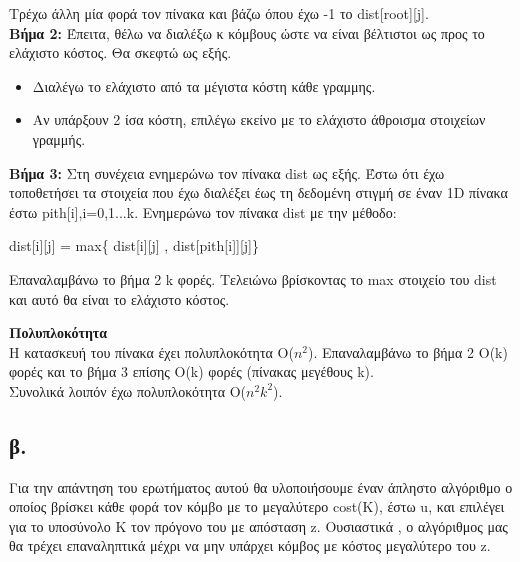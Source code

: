 \documentclass[12pt,a4paper]{article}
\begin{document}
Τρέχω άλλη μία φορά τον πίνακα και βάζω όπου έχω -1 το dist[root][j]. \\

\textbf{Βήμα 2:} Έπειτα, θέλω να διαλέξω κ κόμβους ώστε να είναι βέλτιστοι ως προς το ελάχιστο κόστος. Θα σκεφτώ ως εξής. 
\begin{itemize}
    \item Διαλέγω το ελάχιστο από τα μέγιστα κόστη κάθε γραμμης.
    \item Αν υπάρξουν 2 ίσα κόστη, επιλέγω εκείνο με το ελάχιστο άθροισμα στοιχείων γραμμής.
\end{itemize}

\textbf{Βήμα 3:} Στη συνέχεια ενημερώνω τον πίνακα dist ως εξής. Έστω ότι έχω τοποθετήσει τα στοιχεία που έχω διαλέξει έως τη δεδομένη στιγμή σε έναν 1D πίνακα έστω pith[i],i=0,1...k. Ενημερώνω τον πίνακα dist με την μέθοδο: \\
\begin{center}
    dist[i][j] = max\{ dist[i][j] , dist[pith[i]][j]\}
\end{center}

Επαναλαμβάνω το βήμα 2 k φορές. 
Τελειώνω βρίσκοντας το max στοιχείο του dist και αυτό θα είναι το ελάχιστο κόστος.

\textbf{Πολυπλοκότητα} \\
Η κατασκευή του πίνακα έχει πολυπλοκότητα O($n^2$). Επαναλαμβάνω το βήμα 2 Ο(k) φορές  και το βήμα 3 επίσης Ο(k) φορές (πίνακας μεγέθους k).\\
Συνολικά λοιπόν έχω πολυπλοκότητα O($n^2k^2$).

\subsection*{β.}
Για την απάντηση του ερωτήματος αυτού θα υλοποιήσουμε έναν άπληστο αλγόριθμο ο οποίος βρίσκει κάθε φορά τον κόμβο με το μεγαλύτερο cost(K), έστω u, και επιλέγει για το υποσύνολο K τον πρόγονο του με απόσταση z. Ουσιαστικά , ο αλγόριθμος μας θα τρέχει επαναληπτικά μέχρι να μην υπάρχει κόμβος με κόστος μεγαλύτερο του z.\par
\end{document}
